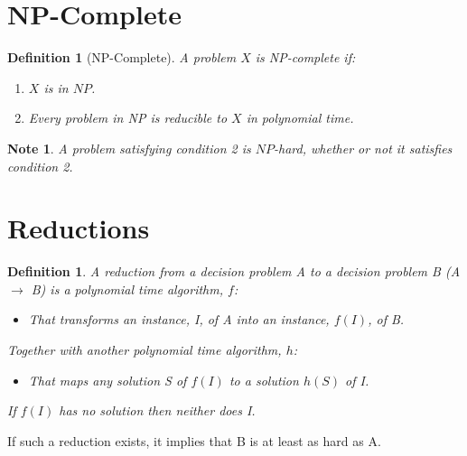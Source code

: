 \documentclass[twoside]{article}
\newtheorem{definition}[theorem]{Definition}
\newtheorem{note}[theorem]{Note}
\begin{document}
\section{NP-Complete}

\begin{definition}[NP-Complete]
A problem $X$ is NP-complete if:
\begin{enumerate}
    \item $X$ is in $NP$.
    \item Every problem in NP is reducible to $X$ in polynomial time.
\end{enumerate}
\end{definition}

\begin{note}
A problem satisfying condition 2 is $NP$-hard, whether or not it satisfies condition 2.
\end{note}


\section{Reductions}

\begin{definition}
A reduction from a decision problem A to a decision problem B (A $\to$ B) is a 
polynomial time algorithm, $f$:
\begin{itemize}
    \item That transforms an instance, I, of A into an instance, $f(I)$, of B.
\end{itemize}
Together with another polynomial time algorithm, $h$:
\begin{itemize}
    \item That maps any solution S of $f(I)$ to a solution $h(S)$ of I.
\end{itemize}
If $f(I)$ has no solution then neither does I.
\end{definition}

\begin{center}
\end{center}

If such a reduction exists, it implies that B is at least as hard as A.
\end{document}
